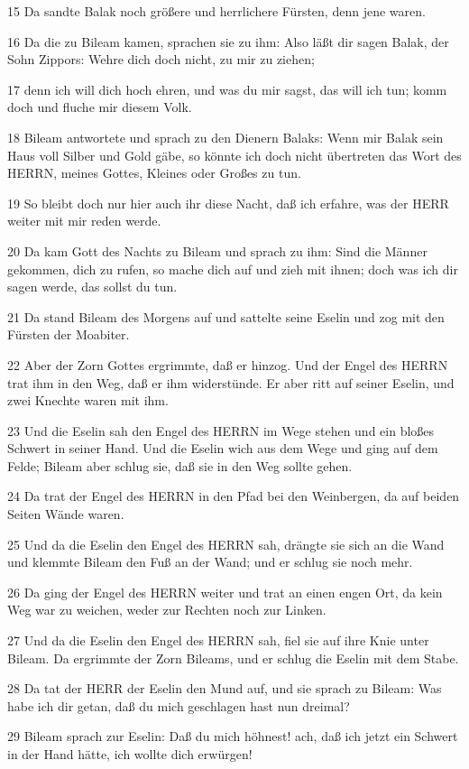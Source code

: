 \par 15 Da sandte Balak noch größere und herrlichere Fürsten, denn jene waren.
\par 16 Da die zu Bileam kamen, sprachen sie zu ihm: Also läßt dir sagen Balak, der Sohn Zippors: Wehre dich doch nicht, zu mir zu ziehen;
\par 17 denn ich will dich hoch ehren, und was du mir sagst, das will ich tun; komm doch und fluche mir diesem Volk.
\par 18 Bileam antwortete und sprach zu den Dienern Balaks: Wenn mir Balak sein Haus voll Silber und Gold gäbe, so könnte ich doch nicht übertreten das Wort des HERRN, meines Gottes, Kleines oder Großes zu tun.
\par 19 So bleibt doch nur hier auch ihr diese Nacht, daß ich erfahre, was der HERR weiter mit mir reden werde.
\par 20 Da kam Gott des Nachts zu Bileam und sprach zu ihm: Sind die Männer gekommen, dich zu rufen, so mache dich auf und zieh mit ihnen; doch was ich dir sagen werde, das sollst du tun.
\par 21 Da stand Bileam des Morgens auf und sattelte seine Eselin und zog mit den Fürsten der Moabiter.
\par 22 Aber der Zorn Gottes ergrimmte, daß er hinzog. Und der Engel des HERRN trat ihm in den Weg, daß er ihm widerstünde. Er aber ritt auf seiner Eselin, und zwei Knechte waren mit ihm.
\par 23 Und die Eselin sah den Engel des HERRN im Wege stehen und ein bloßes Schwert in seiner Hand. Und die Eselin wich aus dem Wege und ging auf dem Felde; Bileam aber schlug sie, daß sie in den Weg sollte gehen.
\par 24 Da trat der Engel des HERRN in den Pfad bei den Weinbergen, da auf beiden Seiten Wände waren.
\par 25 Und da die Eselin den Engel des HERRN sah, drängte sie sich an die Wand und klemmte Bileam den Fuß an der Wand; und er schlug sie noch mehr.
\par 26 Da ging der Engel des HERRN weiter und trat an einen engen Ort, da kein Weg war zu weichen, weder zur Rechten noch zur Linken.
\par 27 Und da die Eselin den Engel des HERRN sah, fiel sie auf ihre Knie unter Bileam. Da ergrimmte der Zorn Bileams, und er schlug die Eselin mit dem Stabe.
\par 28 Da tat der HERR der Eselin den Mund auf, und sie sprach zu Bileam: Was habe ich dir getan, daß du mich geschlagen hast nun dreimal?
\par 29 Bileam sprach zur Eselin: Daß du mich höhnest! ach, daß ich jetzt ein Schwert in der Hand hätte, ich wollte dich erwürgen!
